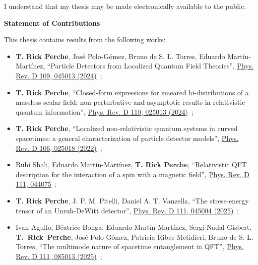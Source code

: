   \noindent
I understand that my thesis may be made electronically available to the public.

\cleardoublepage
{}    %

\begin{center}\textbf{Statement of Contributions}\end{center}

\noindent This thesis contains results from the following works:

\begin{itemize}
    \item[(1)] \textbf{T. Rick Perche}, José Polo-Gómez, Bruno de S. L. Torres, Eduardo Martín-Martínez, ``Particle Detectors from Localized Quantum Field Theories'', \href{https://doi.org/10.1103/PhysRevD.109.045013}{Phys. Rev. D 109, 045013 (2024)}~\cite{QFTPD};
    \item[(2)] \textbf{T. Rick Perche}, ``Closed-form expressions for smeared bi-distributions of a massless scalar field: non-perturbative and asymptotic results in relativistic quantum information'', \href{https://doi.org/10.1103/PhysRevD.110.025013}{Phys. Rev. D 110, 025013 (2024)}~\cite{analytical};
    \item[(3)] \textbf{T. Rick Perche}, ``Localized non-relativistic quantum systems in curved spacetimes: a general characterization of particle detector models'', \href{https://doi.org/10.1103/PhysRevD.106.025018}{Phys. Rev. D 106, 025018 (2022)}~\cite{generalPD};
    \item[(4)] Ruhi Shah, Eduardo Martín-Martínez, \textbf{T. Rick Perche}, ``Relativistic QFT description for the interaction of a spin with a magnetic field'', \href{https://doi.org/10.1103/PhysRevD.111.044075}{Phys. Rev. D 111, 044075}~\cite{ruhi};
    \item[(5)] \textbf{T. Rick Perche}, J. P. M. Pitelli, Daniel A. T. Vanzella, ``The stress-energy tensor of an Unruh-DeWitt detector'', \href{https://doi.org/10.1103/PhysRevD.111.045004}{Phys. Rev. D 111, 045004 (2025)}~\cite{TmunuUDW};
    \item[(6)] Ivan Agullo, Béatrice Bonga, Eduardo Martín-Martínez, Sergi Nadal-Gisbert, \\\mbox{\textbf{T. Rick Perche}}, José Polo-Gómez, Patricia Ribes-Metidieri, Bruno de S. L. Torres, ``The multimode nature of spacetime entanglement in QFT'', \href{https://doi.org/10.1103/PhysRevD.111.085013}{Phys. Rev. D 111, 085013 (2025)}~\cite{patriciaAndI};

\end{itemize}
